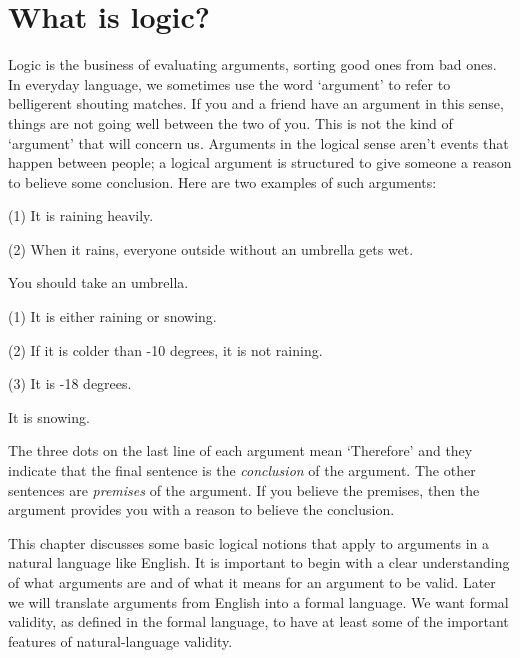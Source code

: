 \chapter{What is logic?}
\label{ch.intro}

Logic is the business of evaluating arguments, sorting good ones from bad ones. In everyday language, we sometimes use the word `argument' to refer to belligerent shouting matches. If you and a friend have an argument in this sense, things are not going well between the two of you. This is not the kind of `argument' that will concern us. Arguments in the logical sense aren't events that happen between people; a logical argument is structured to give someone a reason to believe some conclusion. Here are two examples of such arguments:

\label{argRaining}
\begin{earg}
\item[(1)] It is raining heavily.
\item[(2)] When it rains, everyone outside without an umbrella gets wet.
\item[\therefore] You should take an umbrella.
\end{earg}


\label{argSnowing}
\begin{earg}
\item[(1)] It is either raining or snowing.
\item[(2)] If it is colder than -10 degrees, it is not raining.
\item[(3)] It is -18 degrees.
\item[\therefore] It is snowing.
\end{earg}
 
The three dots on the last line of each argument mean `Therefore' and they indicate that the final sentence is the \emph{conclusion} of the argument. The other sentences are \emph{premises} of the argument. If you believe the premises, then the argument provides you with a reason to believe the conclusion.

This chapter discusses some basic logical notions that apply to arguments in a natural language like English. It is important to begin with a clear understanding of what arguments are and of what it means for an argument to be valid. Later we will translate arguments from English into a formal language. We want formal validity, as defined in the formal language, to have at least some of the important features of natural-language validity.

